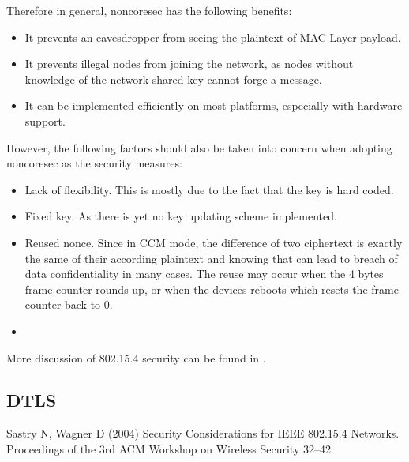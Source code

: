 Therefore in general, noncoresec has the following benefits:
\begin{itemize}
\item It prevents an eavesdropper from seeing the plaintext of MAC Layer payload.
\item It prevents illegal nodes from joining the network, as nodes without knowledge of the network shared key cannot forge a message.
\item It can be implemented efficiently on most platforms, especially with hardware support.
\end{itemize}

However, the following factors should also be taken into concern when adopting noncoresec as the security measures:
\begin{itemize}
\item Lack of flexibility. This is mostly due to the fact that the key is hard coded.
\item Fixed key. As there is yet no key updating scheme implemented.
\item Reused nonce. Since in CCM mode, the difference of two ciphertext is exactly the same of their according plaintext and knowing that can lead to breach of data confidentiality in many cases. The reuse may occur when the 4 bytes frame counter rounds up, or when the devices reboots which resets the frame counter back to $0$.
\item 
\end{itemize}

More discussion of 802.15.4 security can be found in \cite{802154sec}.

\subsection{DTLS}




\begin{thebibliography}{99.}
 Sastry N, Wagner D (2004) Security Considerations for IEEE 802.15.4 Networks. Proceedings of the 3rd ACM Workshop on Wireless Security 32--42
\end{thebibliography}